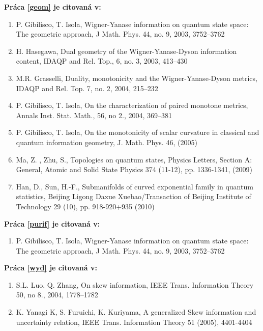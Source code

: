 \documentclass[A4paper]{article}
\begin{document}
{\bf Pr\'aca \ref{geom} je citovan\'a v:}
\begin{enumerate}
\item  P. Gibilisco, T. Isola, Wigner-Yanase information on quantum state
space: The geometric approach, J Math. Phys. 44, no. 9, 2003, 3752--3762

\item  H. Hasegawa, Dual geometry of the Wigner-Yanase-Dyson information
content, IDAQP and Rel. Top., 6, no. 3, 2003, 413--430
\

\item  M.R. Grasselli, Duality, monotonicity and the Wigner-Yanase-Dyson
metrics,   IDAQP and Rel. Top. 7, no. 2, 2004, 215--232

\item  P. Gibilisco, T. Isola, On the characterization of paired monotone
metrics, Annals Inst. Stat. Math., 56, no 2., 2004, 369--381

\item  P. Gibilisco, T. Isola, On the monotonicity of scalar curvature in
classical and quantum information geometry, J. Math. Phys. 46, (2005)

\item Ma, Z. , Zhu, S., Topologies on quantum states, 	Physics Letters, Section A: General, Atomic and Solid State Physics 374 (11-12), pp. 1336-1341,  (2009)


\item Han, D., Sun, H.-F., Submanifolds of curved exponential family in quantum 
statistics, 	Beijing Ligong Daxue Xuebao/Transaction of Beijing Institute of Technology 29 (10), pp. 918-920+935 (2010)

\setcounter{poo}{\value{enumi}}

\end{enumerate}

{\bf Pr\'aca \ref{purif} je citovan\'a v:}
\begin{enumerate}
\setcounter{enumi}{\value{poo}}

\item   P. Gibilisco, T. Isola, Wigner-Yanase information on quantum state
space: The geometric approach, J Math. Phys. 44, no. 9, 2003, 3752--3762
\setcounter{poo}{\value{enumi}}

\end{enumerate}

{\bf Pr\'aca \ref{wyd} je citovan\'a v:}
\begin{enumerate}
\setcounter{enumi}{\value{poo}}

\item  S.L. Luo, Q. Zhang, On skew information, IEEE Trans. Information Theory 50, no 8., 2004, 1778--1782
\item   K. Yanagi K, S. Furuichi, K. Kuriyama, 
A generalized Skew information and uncertainty relation, 
IEEE Trans.  Information  Theory 51 (2005), 4401-4404 
\setcounter{poo}{\value{enumi}}

\end{enumerate}
\end{document}
